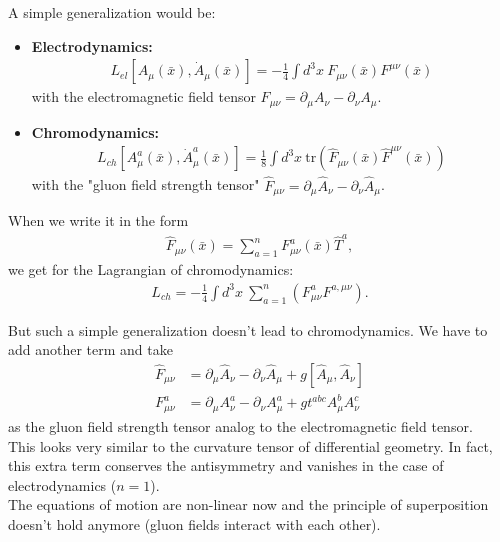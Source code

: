 A simple generalization would be:

\begin{itemize}
\item \textbf{Electrodynamics:} 
\begin{align}
L_{el}[A_{\mu}(\bar{x}), \dot{A}_{\mu}(\bar{x})] = - \frac{1}{4} \displaystyle\int d^3 x \ F_{\mu \nu}(\bar{x}) F^{\mu \nu}(\bar{x}) 
\end{align}
with the electromagnetic field tensor $F_{\mu \nu} = \partial_{\mu} A_{\nu} - \partial_{\nu} A_{\mu}$.
\item \textbf{Chromodynamics:} 
\begin{align}
L_{ch}[A_{\mu}^a(\bar{x}), \dot{A}_{\mu}^a(\bar{x})] = \frac{1}{8} \displaystyle\int d^3 x \ \text{tr}\left(\hat{F}_{\mu \nu}(\bar{x}) \hat{F}^{\mu \nu}(\bar{x}) \right) 
\end{align}
with the "gluon field strength tensor" $\hat{F}_{\mu \nu} = \partial_{\mu} \hat{A}_{\nu} - \partial_{\nu} \hat{A}_{\mu}$.
\end{itemize}

When we write it in the form
\begin{align}
\hat{F}_{\mu \nu}(\bar{x}) = \sum_{a=1}^n F_{\mu \nu}^a(\bar{x}) \hat{T}^a ,
\end{align}
we get for the Lagrangian of chromodynamics:
\begin{align}
L_{ch} = - \frac{1}{4} \displaystyle\int d^3 x \ \sum_{a=1}^n \left( F_{\mu \nu}^a F^{a, \mu \nu} \right) .
\end{align}

But such a simple generalization doesn't lead to chromodynamics. We have to add another term and take
\begin{align}
\hat{F}_{\mu \nu} &= \partial_{\mu} \hat{A}_{\nu} - \partial_{\nu} \hat{A}_{\mu} + g [ \hat{A}_{\mu},\hat{A}_{\nu} ] \\
F_{\mu \nu}^a &= \partial_{\mu} A_{\nu}^a - \partial_{\nu} A_{\mu}^a + g t^{abc} A_{\mu}^b A_{\nu}^c
\end{align}
as the gluon field strength tensor analog to the electromagnetic field tensor. \\
This looks very similar to the curvature tensor of differential geometry. In fact, this extra term conserves the antisymmetry and vanishes in the case of electrodynamics ($n=1$). \\
The equations of motion are non-linear now and the principle of superposition doesn't hold anymore (gluon fields interact with each other).

